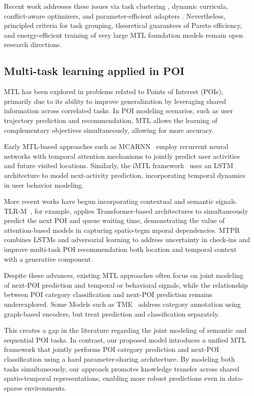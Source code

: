 Recent work addresses these issues via task clustering \cite{standley2020tasks}, dynamic curricula, conflict-aware optimizers, and parameter-efficient adapters \cite{yu2024survey}. Nevertheless, principled criteria for task grouping, theoretical guarantees of Pareto efficiency, and energy-efficient training of very large MTL foundation models remain open research directions.


\subsection{Multi-task learning applied in POI}
MTL has been explored in problems related to Points of Interest (POIs), primarily due to its ability to improve generalization by leveraging shared information across correlated tasks. In POI modeling scenarios, such as user trajectory prediction and recommendation, MTL allows the learning of complementary objectives simultaneously, allowing for more accuracy.


Early MTL-based approaches such as MCARNN~\cite{Liao2018} employ recurrent neural networks with temporal attention mechanisms to jointly predict user activities and future visited locations. Similarly, the iMTL framework~\cite{Zhang2020} uses an LSTM architecture to model next-activity prediction, incorporating temporal dynamics in user behavior modeling.

More recent works have begun incorporating contextual and semantic signals. TLR-M~\cite{Halder2021}, for example, applies Transformer-based architectures to simultaneously predict the next POI and queue waiting time, demonstrating the value of attention-based models in capturing spatio-tegm
mporal dependencies. MTPR~\cite{Xia2020} combines LSTMs and adversarial learning to address uncertainty in check-ins and improve multi-task POI recommendation both location and temporal context with a generative component.

Despite these advances, existing MTL approaches often focus on joint modeling of next-POI prediction and temporal or behavioral signals, while the relationship between POI category classification and next-POI prediction remains underexplored. Some Models such as TME~\cite{Xu2023} address category annotation using graph-based encoders, but treat prediction and classification separately.

This creates a gap in the literature regarding the joint modeling of semantic and sequential POI tasks. In contrast, our proposed model introduces a unified MTL framework that jointly performs POI category prediction and next-POI classification using a hard parameter-sharing architecture. By modeling both tasks simultaneously, our approach promotes knowledge transfer across shared spatio-temporal representations, enabling more robust predictions even in data-sparse environments.


